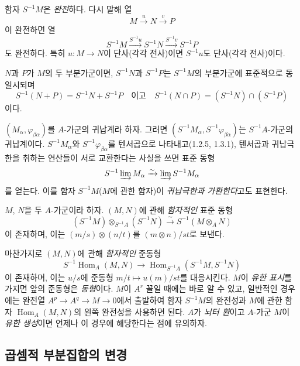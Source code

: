 \begin{env}[1.3.2]
\label{0.1.3.2-ko}
함자 $S^{-1}M$은 \emph{완전}하다. 다시 말해 열
\[
  M\xrightarrow{u}N\xrightarrow{v}P
\]
이 완전하면 열
\[
  S^{-1}M\xrightarrow{S^{-1}u}S^{-1}N\xrightarrow{S^{-1}v}S^{-1}P
\]
도 완전하다.
특히 $u:M\to N$이 단사(각각 전사)이면 $S^{-1}u$도 단사(각각 전사)이다.

$N$과 $P$가 $M$의 두 부분가군이면, $S^{-1}N$과 $S^{-1}P$는 $S^{-1}M$의 부분가군에 표준적으로 동일시되며
\[
  S^{-1}(N+P)=S^{-1}N+S^{-1}P
  \quad\text{이고}\quad
  S^{-1}(N\cap P)=(S^{-1}N)\cap(S^{-1}P)
\]
이다.
\end{env}

\begin{env}[1.3.3]
\label{0.1.3.3-ko}
$(M_\alpha,\varphi_{\beta\alpha})$를 $A$-가군의 귀납계라 하자. 그러면 $(S^{-1}M_\alpha,S^{-1}\varphi_{\beta\alpha})$는 $S^{-1}A$-가군의 귀납계이다.
$S^{-1}M_\alpha$와 $S^{-1}\varphi_{\beta\alpha}$를 텐서곱으로 나타내고(1.2.5, 1.3.1), 텐서곱과 귀납극한을 취하는 연산들이 서로 교환한다는 사실을 쓰면 표준 동형
\[
  S^{-1}\varinjlim M_\alpha\xrightarrow{\sim}\varinjlim S^{-1}M_\alpha
\]
를 얻는다. 이를 함자 $S^{-1}M$($M$에 관한 함자)이 \emph{귀납극한과 가환한다}고도 표현한다.
\end{env}

\begin{env}[1.3.4]
\label{0.1.3.4-ko}
$M$, $N$을 두 $A$-가군이라 하자. $(M,N)$에 관해 \emph{함자적인} 표준 동형
\[
  (S^{-1}M)\otimes_{S^{-1}A}(S^{-1}N)
  \xrightarrow{\sim}
  S^{-1}(M\otimes_A N)
\]
이 존재하며, 이는 $(m/s)\otimes(n/t)$를 $(m\otimes n)/st$로 보낸다.
\end{env}

\begin{env}[1.3.5]
\label{0.1.3.5-ko}
마찬가지로 $(M,N)$에 관해 \emph{함자적인} 준동형
\[
  S^{-1}\operatorname{Hom}_A(M,N)
  \longrightarrow
  \operatorname{Hom}_{S^{-1}A}(S^{-1}M,S^{-1}N)
\]
이 존재하며, 이는 $u/s$에 준동형 $m/t\mapsto u(m)/st$를 대응시킨다.
$M$이 \emph{유한 표시}를 가지면 앞의 준동형은 \emph{동형}이다. $M$이 $A^r$ 꼴일 때에는 바로 알 수 있고, 일반적인 경우에는 완전열 $A^p\to A^q\to M\to 0$에서 출발하여 함자 $S^{-1}M$의 완전성과 $M$에 관한 함자 $\operatorname{Hom}_A(M,N)$의 왼쪽 완전성을 사용하면 된다.
$A$가 \emph{뇌터 환}이고 $A$-가군 $M$이 \emph{유한 생성}이면 언제나 이 경우에 해당한다는 점에 유의하자.
\end{env}

\subsection{곱셈적 부분집합의 변경}
\label{subsection:0.1.4-ko}

